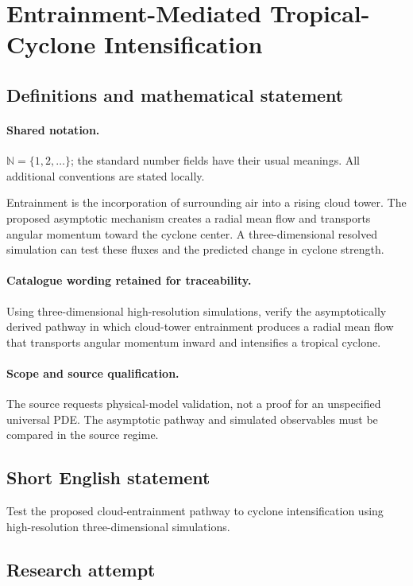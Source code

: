 \documentclass[11pt]{article}
\begin{document}
\section{Entrainment-Mediated Tropical-Cyclone Intensification}\label{statement}

\subsection{Definitions and mathematical statement}

\paragraph{Shared notation.}$\mathbb N=\{1,2,\ldots\}$; the standard number fields have their usual meanings. All additional conventions are stated locally.


Entrainment is the incorporation of surrounding air into a rising cloud tower. The proposed asymptotic mechanism creates a radial mean flow and transports angular momentum toward the cyclone center. A three-dimensional resolved simulation can test these fluxes and the predicted change in cyclone strength.

\paragraph{Catalogue wording retained for traceability.}
Using three-dimensional high-resolution simulations, verify the asymptotically derived pathway in which cloud-tower entrainment produces a radial mean flow that transports angular momentum inward and intensifies a tropical cyclone.

\paragraph{Scope and source qualification.}The source requests physical-model validation, not a proof for an unspecified universal PDE. The asymptotic pathway and simulated observables must be compared in the source regime.
\subsection{Short English statement}
Test the proposed cloud-entrainment pathway to cyclone intensification using high-resolution three-dimensional simulations.
\subsection{Research attempt}
\end{document}
